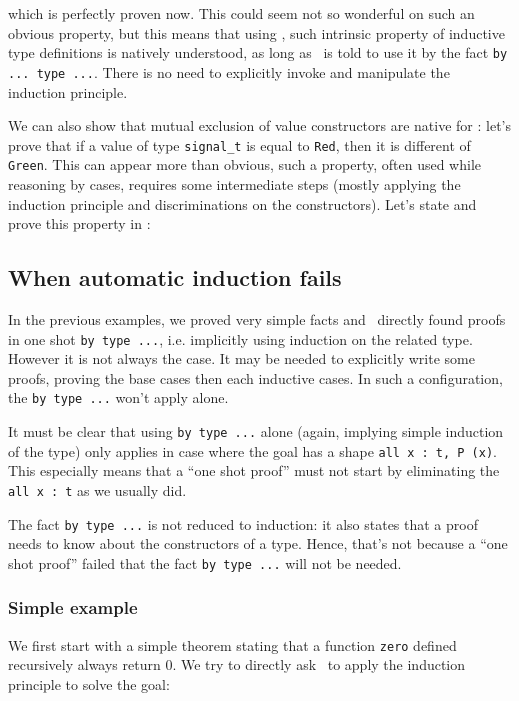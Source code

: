 \documentclass[11pt,a4paper,twoside,onecolumn,fullpage]{article}
\begin{document}
{\scriptsize
}

\noindent which is perfectly proven now. This could seem not so
wonderful on such an obvious property, but this means that using
\zenon, such intrinsic property of inductive type definitions is
natively understood, as long as \zenon\ is told to use it by the fact
\lstinline"by ... type ...". There is no need to explicitly invoke
and manipulate the induction principle.

\medskip
We can also show that mutual exclusion of value constructors are
native for \zenon: let's prove that if a value of type
\lstinline"signal_t" is equal to \lstinline"Red", then it is different
of \lstinline"Green". This can appear more than obvious, such a
property, often used while reasoning by cases, requires some
intermediate steps (mostly applying the induction principle and
discriminations on the constructors). Let's state and prove this
property in \focal:

{\scriptsize
}


\subsection{When automatic induction fails}
In the previous examples, we proved very simple facts and \zenon\ directly found
proofs in one shot \lstinline"by type ...", i.e. implicitly using
induction on the related type. However it is not always the case. It
may be needed to explicitly write some proofs, proving the base cases
then each inductive cases. In such a configuration, the
\lstinline"by type ..." won't apply alone.

It must be clear that using \lstinline"by type ..." alone (again,
implying simple induction of the type) only applies in case where the
goal has a shape \lstinline"all x : t, P (x)". This especially means
that a ``one shot proof'' must not start by eliminating the
\lstinline"all x : t" as we usually did.

The fact \lstinline"by type ..." is not reduced to induction: it also
states that a proof needs to know about the constructors of a
type. Hence, that's not because a ``one shot proof'' failed that the
fact \lstinline"by type ..." will not be needed.

\subsubsection{Simple example}
We first start with a simple theorem stating that a function \lstinline"zero"
defined recursively always return 0. We try to directly ask \zenon\ to apply
the induction principle to solve the goal:
\end{document}

